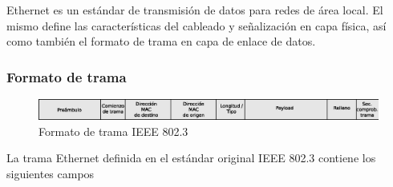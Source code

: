 Ethernet es un estándar de transmisión de datos para redes de área local. El mismo define las características del cableado y señalización en capa física, así como también el formato de trama en capa de enlace de datos. 

\subsubsection{Formato de trama}

\begin{figure}[h]
  \centering
	\includegraphics[width=1\textwidth]{2-sistema/graf/frame.eps}
  \caption{Formato de trama IEEE 802.3}
  \label{fig:frame}
\end{figure}



La trama Ethernet definida en el estándar original IEEE 802.3 contiene los siguientes campos

